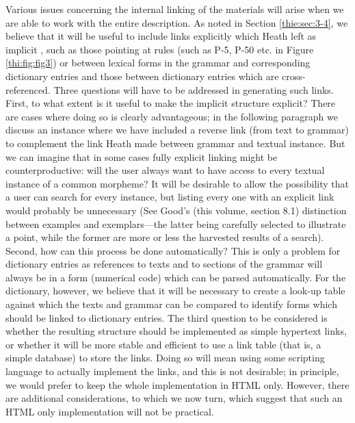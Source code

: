 Various issues concerning the internal linking of the materials will arise when we are able to work with the entire description. As noted in Section \ref{thie:sec:3-4}, we believe that it will be useful to include  links explicitly which Heath left as implicit%
, such as those pointing at rules (such as P-5, P-50 etc. in Figure \ref{thi:fig:fig3}) or between lexical forms in the grammar and corresponding dictionary entries and those between dictionary entries which are cross-referenced. Three questions will have to be addressed in generating such links. First, to what extent is it useful to make the implicit structure explicit? There are cases where doing so is clearly advantageous; in the following paragraph we discuss an instance where we have included a reverse link (from text to grammar) to complement the link Heath made between grammar and textual instance. But we can imagine that in some cases fully explicit linking might be counterproductive: will the user always want to have access to every textual instance of a common morpheme? It will be desirable to allow the possibility that a user can search for every instance, but listing every one with an explicit link would probably be unnecessary (See Good's (this volume, section 8.1) distinction between examples and exemplars{}---the latter being carefully selected to illustrate a point, while the former are more or less the harvested results of a search). %
Second, how can this process be done automatically? This is only a problem for dictionary entries as references to texts and to sections of the grammar will always be in a form (numerical code) which can be parsed automatically. For the dictionary, however, we believe that it will be necessary to create a look-up table against which the texts and grammar can be compared to identify forms which should be linked to dictionary entries. The third question to be considered is whether the resulting structure should be implemented as simple hypertext links, or whether it will be more stable and efficient to use a link table (that is, a simple database) to store the links. Doing so will mean using some scripting language to actually implement the links, and this is not desirable; in principle, we would prefer to keep the whole implementation in HTML only. However, there are additional considerations, to which we now turn, which suggest that such an HTML only implementation will not be practical.

